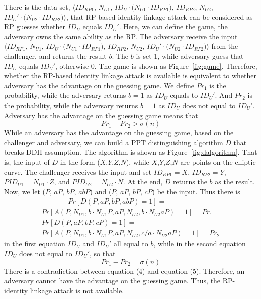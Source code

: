 There is the data set, $\langle ID_{RP1}$, $N_{U1}$, $ID_U \cdot{(N_{U1} \cdot {ID_{RP1})}}$, $ID_{RP2}$, $N_{U2}$, $ID_U' \cdot{(N_{U2} \cdot {ID_{RP2})}}\rangle$, that RP-based identity linkage attack can be considered as RP guesses whether $ID_U$ equals $ID_U'$.
Here, we can define the game, the adversary owns the same ability as the RP. The adversary receive the input $\langle ID_{RP1}$, $N_{U1}$, $ID_U \cdot{(N_{U1} \cdot {ID_{RP1})}}$, $ID_{RP2}$, $N_{U2}$, $ID_U' \cdot{(N_{U2} \cdot {ID_{RP2})}}\rangle$ from the challenger, and returns the result $b$.
The $b$ is set 1, while adversary guess that $ID_U$ equals $ID_U'$, otherwise 0. The game is shown as Figure~\ref{fig:game}.
Therefore, whether the RP-based identity linkage attack is available is equivalent to whether adversary has the advantage on the guessing game.
We define $Pr_1$ is the probability, while the adversary returns $b=1$ as $ID_U$ equals to $ID_U'$. And $Pr_2$ is the probability, while the adversary returns $b=1$ as $ID_U$ does not equal to $ID_U'$.
Adversary has the advantage on the guessing game means that
\vspace{-\topsep}
\begin{equation}
Pr_1-Pr_2>\sigma(n)
\end{equation}
While an adversary has the advantage on the guessing game, based on the challenger and adversary, we can build a PPT distinguishing algorithm $D$ that breaks DDH assumption. The algorithm is shown as Figure~\ref{fig:dalgorithm}. That is, the input of $D$ in the form ($X$,$Y$,$Z$,$N$), while $X$,$Y$,$Z$,$N$ are points on the elliptic curve. The challenger receives the input and set $ID_{RP1}=X$, $ID_{RP2}=Y$, $PID_{U1}=N_{U1} \cdot{Z}$, and $PID_{U2}=N_{U2} \cdot{N}$.  At the end, $D$ returns the $b$ as the result.
Now, we let ($P$, $aP$, $bP$, $abP$) and  ($P$, $aP$, $bP$, $cP$) be the input. Thus there is
\vspace{-\topsep}
\begin{multline*}
\ \ \ \ \ \ \ \ \ \ \ \ \ \ \ \ \ Pr[D(P,aP,bP,abP)=1]=\\ Pr[A(P, N_{U1}, b \cdot{N_{U1}P}, aP, N_{U2},b\cdot{N_{U2} aP})=1]=Pr_1\\
Pr[D(P,aP,bP,cP)=1]=\ \ \ \ \ \ \ \ \ \
\\ Pr[A(P, N_{U1}, b \cdot{N_{U1}P}, aP, N_{U2},c/a \cdot{N_{U2}aP})=1]=Pr_2
\end{multline*}
in the first equation $ID_{U} $ and $ ID_{U}'$ all equal to $b$, while in the second equation $ID_{U}$ does not equal to $ID_{U}'$, so that
\begin{equation}
Pr_1-Pr_2=\sigma(n)
\end{equation}
There is a contradiction between equation (4) and equation (5). Therefore, an adversary cannot have the advantage on the guessing game. Thus, the RP-identity linkage attack is not available.


